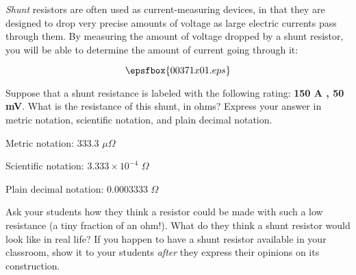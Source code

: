 

{\it Shunt} resistors are often used as current-measuring devices, in that they are designed to drop very precise amounts of voltage as large electric currents pass through them.  By measuring the amount of voltage dropped by a shunt resistor, you will be able to determine the amount of current going through it:

$$\epsfbox{00371x01.eps}$$

Suppose that a shunt resistance is labeled with the following rating: {\bf 150 A , 50 mV}.  What is the resistance of this shunt, in ohms?  Express your answer in metric notation, scientific notation, and plain decimal notation.







Metric notation: 333.3 $\mu \Omega$

Scientific notation: $3.333 \times 10^{-4}$ $\Omega$

Plain decimal notation: 0.0003333 $\Omega$







Ask your students how they think a resistor could be made with such a low resistance (a tiny fraction of an ohm!).  What do they think a shunt resistor would look like in real life?  If you happen to have a shunt resistor available in your classroom, show it to your students {\it after} they express their opinions on its construction.




